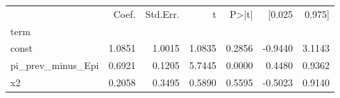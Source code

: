 \begin{tabular}{lrrrrrr}
\toprule
 & Coef. & Std.Err. & t & P>|t| & [0.025 & 0.975] \\
term &  &  &  &  &  &  \\
\midrule
const & 1.0851 & 1.0015 & 1.0835 & 0.2856 & -0.9440 & 3.1143 \\
pi_prev_minus_Epi & 0.6921 & 0.1205 & 5.7445 & 0.0000 & 0.4480 & 0.9362 \\
x2 & 0.2058 & 0.3495 & 0.5890 & 0.5595 & -0.5023 & 0.9140 \\
\bottomrule
\end{tabular}
